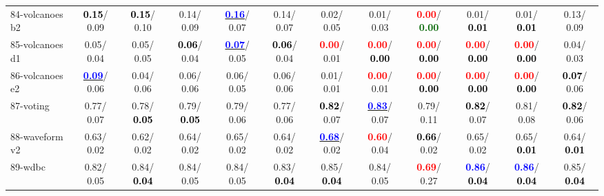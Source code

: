 \begin{table}[h]
\begin{center}
{\begin{tabular}{lc|c|c|c|c|c|c|c|c|c|c}
84-volcanoes b2 & \textcolor{black}{\textbf{  0.15}}/  0.09 & \textcolor{black}{\textbf{  0.15}}/  0.10 &   0.14/  0.09 & \underline{\textcolor{blue}{\textbf{  0.16}}}/  0.07 &   0.14/  0.07 &   0.02/  0.05 &   0.01/  0.03 & \textcolor{red}{\textbf{  0.00}}/\textcolor{darkgreen}{\textbf{  0.00}} &   0.01/\textcolor{black}{\textbf{  0.01}} &   0.01/\textcolor{black}{\textbf{  0.01}} &   0.13/  0.09 \\
85-volcanoes d1 &   0.05/  0.04 &   0.05/  0.05 & \textcolor{black}{\textbf{  0.06}}/  0.04 & \underline{\textcolor{blue}{\textbf{  0.07}}}/  0.05 & \textcolor{black}{\textbf{  0.06}}/  0.04 & \textcolor{red}{\textbf{  0.00}}/  0.01 & \textcolor{red}{\textbf{  0.00}}/\textcolor{black}{\textbf{  0.00}} & \textcolor{red}{\textbf{  0.00}}/\textcolor{black}{\textbf{  0.00}} & \textcolor{red}{\textbf{  0.00}}/\textcolor{black}{\textbf{  0.00}} & \textcolor{red}{\textbf{  0.00}}/\textcolor{black}{\textbf{  0.00}} &   0.04/  0.03 \\ \hline
86-volcanoes e2 & \underline{\textcolor{blue}{\textbf{  0.09}}}/  0.06 &   0.04/  0.06 &   0.06/  0.06 &   0.06/  0.05 &   0.06/  0.06 &   0.01/  0.01 & \textcolor{red}{\textbf{  0.00}}/  0.01 & \textcolor{red}{\textbf{  0.00}}/\textcolor{black}{\textbf{  0.00}} & \textcolor{red}{\textbf{  0.00}}/\textcolor{black}{\textbf{  0.00}} & \textcolor{red}{\textbf{  0.00}}/\textcolor{black}{\textbf{  0.00}} & \textcolor{black}{\textbf{  0.07}}/  0.06 \\
87-voting &   0.77/  0.07 &   0.78/\textcolor{black}{\textbf{  0.05}} &   0.79/\textcolor{black}{\textbf{  0.05}} &   0.79/  0.06 &   0.77/  0.06 & \textcolor{black}{\textbf{  0.82}}/  0.07 & \underline{\textcolor{blue}{\textbf{  0.83}}}/  0.07 &   0.79/  0.11 & \textcolor{black}{\textbf{  0.82}}/  0.07 &   0.81/  0.08 & \textcolor{black}{\textbf{  0.82}}/  0.06 \\
88-waveform v2 &   0.63/  0.02 &   0.62/  0.02 &   0.64/  0.02 &   0.65/  0.02 &   0.64/  0.02 & \underline{\textcolor{blue}{\textbf{  0.68}}}/  0.02 & \textcolor{red}{\textbf{  0.60}}/  0.04 & \textcolor{black}{\textbf{  0.66}}/  0.02 &   0.65/  0.02 &   0.65/\textcolor{black}{\textbf{  0.01}} &   0.64/\textcolor{black}{\textbf{  0.01}} \\
89-wdbc &   0.82/  0.05 &   0.84/\textcolor{black}{\textbf{  0.04}} &   0.84/  0.05 &   0.84/  0.05 &   0.83/\textcolor{black}{\textbf{  0.04}} &   0.85/\textcolor{black}{\textbf{  0.04}} &   0.84/  0.05 & \textcolor{red}{\textbf{  0.69}}/  0.27 & \textcolor{blue}{\textbf{  0.86}}/\textcolor{black}{\textbf{  0.04}} & \textcolor{blue}{\textbf{  0.86}}/\textcolor{black}{\textbf{  0.04}} &   0.85/\textcolor{black}{\textbf{  0.04}} \\

\end{tabular}}
\end{center}
\end{table}
